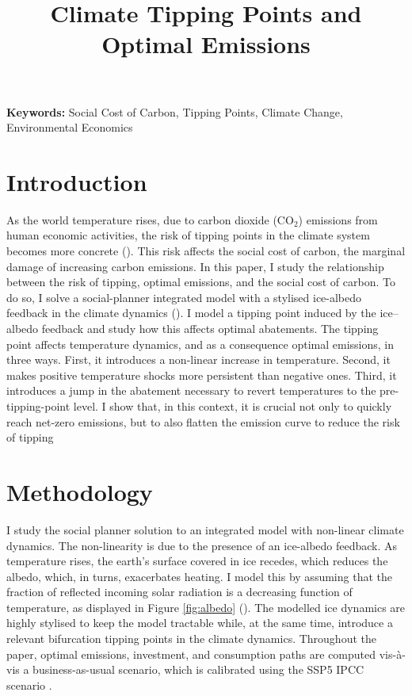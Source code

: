 \documentclass[12pt]{article}
\title{Climate Tipping Points and Optimal Emissions}
\author{} %
\date{} %
\begin{document}
\maketitle

\textbf{Keywords:} Social Cost of Carbon, Tipping Points, Climate Change, Environmental Economics

\section{Introduction}

As the world temperature rises, due to carbon dioxide (CO$_2$) emissions from human economic activities, the risk of tipping points in the climate system becomes more concrete (\cite{ashwin_extreme_2020,sledd_cloudier_2021}). This risk affects the social cost of carbon, the marginal damage of increasing carbon emissions. In this paper, I study the relationship between the risk of tipping, optimal emissions, and the social cost of carbon. To do so, I solve a social-planner integrated model with a stylised ice-albedo feedback in the climate dynamics (\cite{hogg_glacial_2008,ashwin_tipping_2012}). I model a tipping point induced by the ice–albedo feedback and study how this affects optimal abatements. The tipping point affects temperature dynamics, and as a consequence optimal emissions, in three ways. First, it introduces a non-linear increase in temperature. Second, it makes positive temperature shocks more persistent than negative ones. Third, it introduces a jump in the abatement necessary to revert temperatures to the pre-tipping-point level. I show that, in this context, it is crucial not only to quickly reach net-zero emissions, but to also flatten the emission curve to reduce the risk of tipping

\section{Methodology}

I study the social planner solution to an integrated model with non-linear climate dynamics. The non-linearity is due to the presence of an ice-albedo feedback. As temperature rises, the earth's surface covered in ice recedes, which reduces the albedo, which, in turns, exacerbates heating. I model this by assuming that the fraction of reflected incoming solar radiation is a decreasing function of temperature, as displayed in Figure \ref{fig:albedo} (\cite{mendez_investigating_2021,oerlemans_ice_1984}). The modelled ice dynamics are highly stylised to keep the model tractable while, at the same time, introduce a relevant bifurcation tipping points in the climate dynamics. Throughout the paper, optimal emissions, investment, and consumption paths are computed vis-à-vis a business-as-usual scenario, which is calibrated using the SSP5 IPCC scenario \citep{kriegler_fossil-fueled_2017}.
\end{document}

